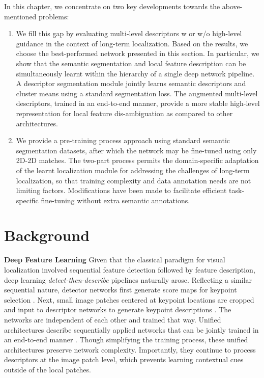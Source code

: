 In this chapter, we concentrate on two key developments towards the above-mentioned problems:
\begin{enumerate}
	\item We fill this gap by evaluating multi-level descriptors w or w/o high-level guidance in the context of long-term localization.  
Based on the results, we choose the best-performed network presented in this section.  
In particular, we show that the semantic segmentation and local feature description can be simultaneously learnt within the hierarchy of a single deep network pipeline.
A descriptor segmentation module jointly learns semantic descriptors and
cluster means using a standard segmentation loss.
The augmented multi-level descriptors, trained in an end-to-end manner, provide a more stable high-level representation for local feature dis-ambiguation as compared to other architectures.
	\item We provide a pre-training process approach using standard semantic segmentation datasets, after which the network may be fine-tuned using only 2D-2D matches. 
The two-part process permits the domain-specific adaptation of the learnt localization module for addressing the challenges of long-term localization, so that training complexity and data annotation needs are not limiting factors. 
Modifications have been made to facilitate efficient task-specific fine-tuning without extra semantic annotations.  
\end{enumerate}

\section{Background}

\noindent \textbf{Deep Feature Learning}
Given that the classical paradigm for visual localization involved sequential feature detection followed by feature description, deep learning {\em detect-then-describe} pipelines naturally arose.  
Reflecting a similar sequential nature, detector networks first generate score maps for keypoint selection \cite{verdie2015tilde, savinov2017quad, barroso2019key}. 
Next, small image patches centered at keypoint locations are cropped and input to descriptor networks to generate keypoint descriptions \cite{mishchuk2017working, tian2017l2, he2018local, keller2018learning, luo2018geodesc, mishkin2018repeatability, mukundan2019explicit, ebel2019beyond, tian2019sosnet}.  
The networks are independent of each other and trained that way.  
Unified architectures describe sequentially applied networks that can be jointly trained in an end-to-end manner \cite{yi2016lift, ono2018lf}. 
Though simplifying the training process, these unified architectures preserve network complexity. 
Importantly, they continue to process descriptors at the image patch level, which prevents learning contextual cues outside of the local patches.


